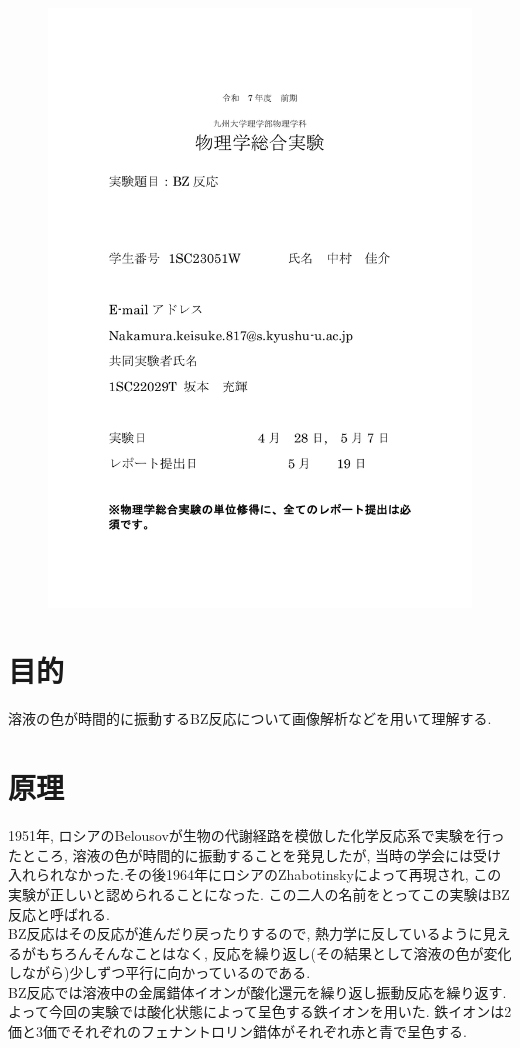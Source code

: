 \documentclass[11pt]{ltjsarticle}
\begin{document}
\begin{figure}[H]
  \centering
  \includegraphics[width=0.98\columnwidth]{hyoushiBZ.pdf}
\end{figure}

  \section*{目的}
    溶液の色が時間的に振動するBZ反応について画像解析などを用いて理解する.
  \section*{原理}
    1951年, ロシアのBelousovが生物の代謝経路を模倣した化学反応系で実験を行ったところ, 溶液の色が時間的に振動することを発見したが, 当時の学会には受け入れられなかった.その後1964年にロシアのZhabotinskyによって再現され, この実験が正しいと認められることになった. この二人の名前をとってこの実験はBZ反応と呼ばれる. \\
    BZ反応はその反応が進んだり戻ったりするので, 熱力学に反しているように見えるがもちろんそんなことはなく, 反応を繰り返し(その結果として溶液の色が変化しながら)少しずつ平行に向かっているのである. \\
    BZ反応では溶液中の金属錯体イオンが酸化還元を繰り返し振動反応を繰り返す. よって今回の実験では酸化状態によって呈色する鉄イオンを用いた. 鉄イオンは2価と3価でそれぞれのフェナントロリン錯体がそれぞれ赤と青で呈色する. 
\end{document}
